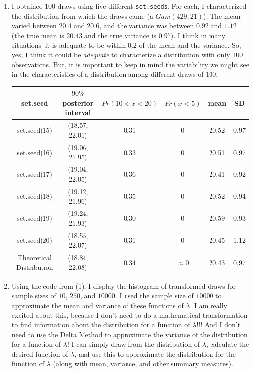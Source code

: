 \documentclass[12pt]{article}\usepackage[]{graphicx}\usepackage[]{color}
\begin{document}
\begin{doublespacing}
\begin{enumerate}
\item I obtained $100$ draws using five different \verb+set.seeds+. For each, I characterized the distribution from which the draws came (a $Gam(429, 21)$). The mean varied between $20.4$ and $20.6$, and the variance was between $0.92$ and $1.12$ (the true mean is $20.43$ and the true variance is $0.97$). I think in many situations, it is adequate to be within $0.2$ of the mean and the variance. So, yes, I think it could be {\it adequate} to characterize a distribution with only $100$ observations. But, it is important to keep in mind the variability we might see in the characteristics of a distribution among different draws of $100$. 

\begin{table} [H]
\centering
\begin{tabular} {c|c|c|c|c|c}
set.seed & $90\%$ posterior interval & $Pr(10 < x < 20)$ & $Pr(x < 5)$ & mean & SD \\
\hline 
set.seed(15) & (18.57, 22.01) & 0.31 & 0 & 20.52 & 0.97 \\
set.seed(16) & (19.06, 21.95) & 0.33 & 0 & 20.51 & 0.97 \\
set.seed(17) & (19.04, 22.05) & 0.36 & 0 & 20.41 & 0.92 \\
set.seed(18) & (19.12, 21.96) & 0.35 & 0 & 20.52 & 0.94 \\
set.seed(19) & (19.24, 21.93) & 0.30 & 0 & 20.59 & 0.93 \\
set.seed(20) & (18.55, 22.07) & 0.31 & 0 & 20.45 & 1.12 \\
Theoretical Distribution & (18.84, 22.08) & 0.34 & $\approx 0$ & 20.43 & 0.97 \\
\hline
\end{tabular}
\end{table}



\vspace{.05in}
\item Using the code from (1), I display the histogram of transformed draws for sample sizes of $10$, $250$, and $10000$. I used the sample size of $10000$ to approximate the mean and variance of these functions of $\lambda$. I am really excited about this, because I don't need to do a mathematical transformation to find information about the distribution for a function of $\lambda$!!! And I don't need to use the Delta Method to approximate the variance of the distribution for a function of $\lambda$! I can simply draw from the distribution of $\lambda$, calculate the desired function of $\lambda$, and use this to approximate the distribution for the function of $\lambda$ (along with mean, variance, and other summary measures).


\end{enumerate}
\end{doublespacing}
\end{document}
